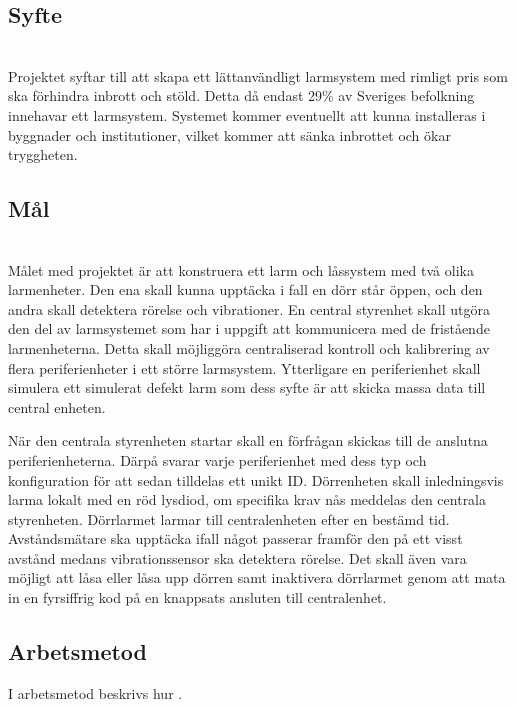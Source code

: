 \documentclass{article}
\begin{document}
\subsection{Syfte}
\\
Projektet syftar till att skapa ett lättanvändligt larmsystem med rimligt pris som ska förhindra inbrott och stöld. Detta då endast 29\% av Sveriges befolkning innehavar ett larmsystem.\cite{SSF} Systemet kommer eventuellt att kunna installeras i byggnader och institutioner, vilket kommer att sänka inbrottet och ökar tryggheten.


\subsection{Mål}
\\
Målet med projektet är att konstruera ett larm och låssystem med två olika larmenheter. Den ena skall kunna upptäcka i fall en dörr står öppen, och den andra skall detektera rörelse och vibrationer. 
En central styrenhet skall utgöra den del av larmsystemet som har i uppgift att kommunicera med de fristående larmenheterna.
Detta skall möjliggöra centraliserad kontroll och kalibrering av flera periferienheter i ett större larmsystem.
Ytterligare en periferienhet skall simulera ett simulerat defekt larm som dess syfte är att skicka massa data till central enheten.

När den centrala styrenheten startar skall en förfrågan skickas till de anslutna periferienheterna. Därpå svarar varje periferienhet med dess typ och konfiguration för att sedan tilldelas ett unikt ID. Dörrenheten skall inledningsvis larma lokalt med en röd lysdiod, om specifika krav nås meddelas den centrala styrenheten. Dörrlarmet larmar till centralenheten efter en bestämd tid. Avståndsmätare ska upptäcka ifall något passerar framför den på ett visst avstånd medans vibrationssensor ska detektera rörelse. Det skall även vara möjligt att låsa eller låsa upp dörren samt inaktivera dörrlarmet genom att mata in en fyrsiffrig kod på en knappsats ansluten till centralenhet.


\subsection{Arbetsmetod}
I arbetsmetod beskrivs hur .
\end{document}
